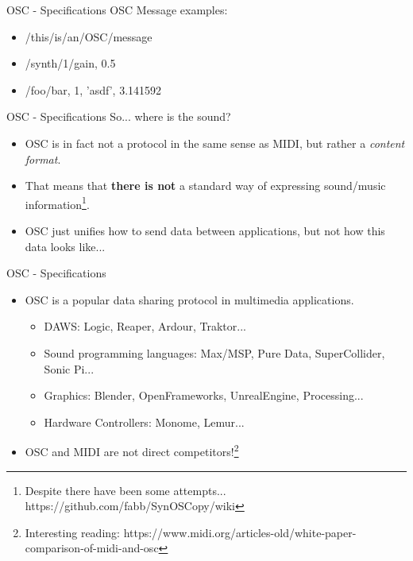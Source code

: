 \documentclass{beamer}
\begin{document}
\begin{frame}{OSC - Specifications}
    OSC Message examples:\\
    \vspace{5mm}
    \begin{itemize}
        \item /this/is/an/OSC/message
        \item /synth/1/gain, 0.5
        \item /foo/bar, 1, 'asdf', 3.141592
    \end{itemize}  
\end{frame}

\begin{frame}{OSC - Specifications}
    So... where is the sound?
    \begin{itemize}
        \item OSC is in fact not a protocol in the same sense as MIDI, but rather a \textit{content format}.
        \item That means that \textbf{there is not} a standard way of expressing sound/music information\footnote{Despite there have been some attempts... https://github.com/fabb/SynOSCopy/wiki}.
        \item OSC just unifies how to send data between applications, but not how this data looks like...
    \end{itemize}
\end{frame}

\begin{frame}{OSC - Specifications}
    \begin{itemize}
        \item OSC is a popular data sharing protocol in multimedia applications.
        \begin{itemize}
            \item DAWS: Logic, Reaper, Ardour, Traktor...
            \item Sound programming languages: Max/MSP, Pure Data, SuperCollider, Sonic Pi...
            \item Graphics: Blender, OpenFrameworks, UnrealEngine, Processing...
            \item Hardware Controllers: Monome, Lemur...
        \end{itemize}
        \item OSC and MIDI are not direct competitors!\footnote{Interesting reading: https://www.midi.org/articles-old/white-paper-comparison-of-midi-and-osc}
    \end{itemize}
\end{frame}
\end{document}
